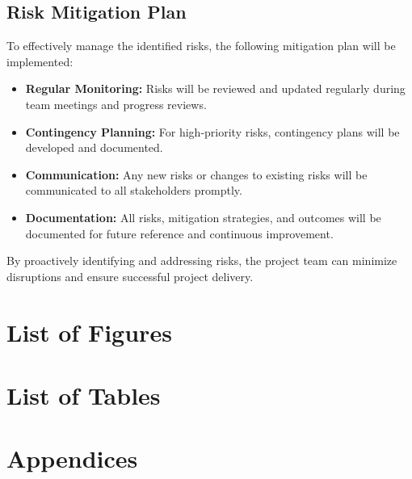 \documentclass{article}
\begin{document}
\subsection{Risk Mitigation Plan}
To effectively manage the identified risks, the following mitigation plan will be implemented:
\begin{itemize}
    \item \textbf{Regular Monitoring:} Risks will be reviewed and updated regularly during team meetings and progress reviews.
    \item \textbf{Contingency Planning:} For high-priority risks, contingency plans will be developed and documented.
    \item \textbf{Communication:} Any new risks or changes to existing risks will be communicated to all stakeholders promptly.
    \item \textbf{Documentation:} All risks, mitigation strategies, and outcomes will be documented for future reference and continuous improvement.
\end{itemize}
\vspace{1em}
By proactively identifying and addressing risks, the project team can minimize disruptions and ensure successful project delivery.

\newpage

\section{List of Figures}

\section{List of Tables}

\section{Appendices}
\end{document}
